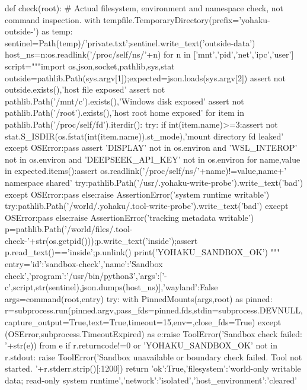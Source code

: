 def check(root):
    # Actual filesystem, environment and namespace check, not command inspection.
    with tempfile.TemporaryDirectory(prefix='yohaku-outside-') as temp:
        sentinel=Path(temp)/'private.txt';sentinel.write_text('outside-data')
        host_ns={n:os.readlink('/proc/self/ns/'+n) for n in ['mnt','pid','net','ipc','user']}
        script="""import os,json,socket,pathlib,sys,stat
outside=pathlib.Path(sys.argv[1]);expected=json.loads(sys.argv[2])
assert not outside.exists(),'host file exposed'
assert not pathlib.Path('/mnt/c').exists(),'Windows disk exposed'
assert not pathlib.Path('/root').exists(),'host root home exposed'
for item in pathlib.Path('/proc/self/fd').iterdir():
 try:
  if int(item.name)>=3:assert not stat.S_ISDIR(os.fstat(int(item.name)).st_mode),'mount directory fd leaked'
 except OSError:pass
assert 'DISPLAY' not in os.environ and 'WSL_INTEROP' not in os.environ and 'DEEPSEEK_API_KEY' not in os.environ
for name,value in expected.items():assert os.readlink('/proc/self/ns/'+name)!=value,name+' namespace shared'
try:pathlib.Path('/usr/.yohaku-write-probe').write_text('bad')
except OSError:pass
else:raise AssertionError('system runtime writable')
try:pathlib.Path('/world/.yohaku/.tool-write-probe').write_text('bad')
except OSError:pass
else:raise AssertionError('tracking metadata writable')
p=pathlib.Path('/world/files/.tool-check-'+str(os.getpid()));p.write_text('inside');assert p.read_text()=='inside';p.unlink()
print('YOHAKU_SANDBOX_OK')
"""
        entry={'id':'sandbox-check','name':'Sandbox check','program':'/usr/bin/python3','args':['-c',script,str(sentinel),json.dumps(host_ns)],'wayland':False}
        args=command(root,entry)
        try:
            with PinnedMounts(args,root) as pinned:
                r=subprocess.run(pinned.argv,pass_fds=pinned.fds,stdin=subprocess.DEVNULL,capture_output=True,text=True,timeout=15,env={},close_fds=True)
        except (OSError,subprocess.TimeoutExpired) as e:raise ToolError('Sandbox check failed: '+str(e)) from e
        if r.returncode!=0 or 'YOHAKU_SANDBOX_OK' not in r.stdout:
            raise ToolError('Sandbox unavailable or boundary check failed. Tool not started. '+r.stderr.strip()[:1200])
    return {'ok':True,'filesystem':'world-only writable data; read-only system runtime','network':'isolated','host_environment':'cleared'}

